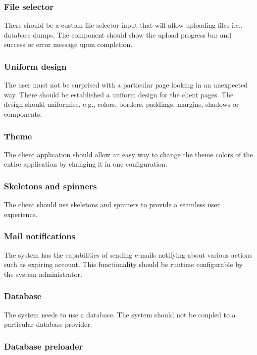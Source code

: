 \documentclass[a4paper,twoside,12pt]{book}
\begin{document}
\subsubsection{File selector}

There should be a custom file selector input that will allow uploading files i.e., database dumps. The component should show the upload progress bar and success or error message upon completion.

\subsubsection{Uniform design}

The user must not be surprised with a particular page looking in an unexpected way. There should be established a uniform design for the client pages. The design should uniformise, e.g., colors, borders, paddings, margins, shadows or components.

\subsubsection{Theme}

The client application should allow an easy way to change the theme colors of the entire application by changing it in one configuration.

\subsubsection{Skeletons and spinners}

The client should use skeletons and spinners to provide a seamless user experience.

\subsubsection{Mail notifications}

The system has the capabilities of sending e-mails notifying about various actions such as expiring account. This functionality should be runtime configurable by the system administrator.

\subsubsection{Database}

The system needs to use a database. The system should not be coupled to a particular database provider.

\subsubsection{Database preloader}
\end{document}
